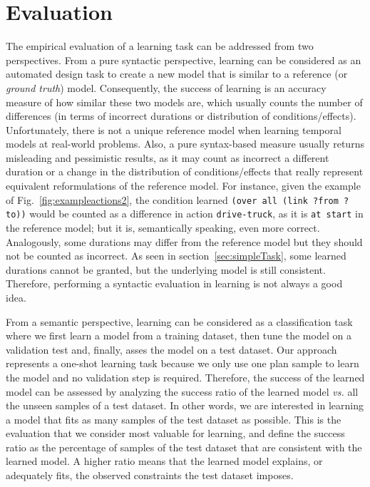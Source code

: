 \documentclass{ecai}
\begin{document}
\section{Evaluation}
\label{sec:evaluation}
The empirical evaluation of a learning task can be addressed from two perspectives. From a pure syntactic perspective, learning can be considered as an automated design task to create a new model that is similar to a reference (or {\em ground truth}) model. Consequently, the success of learning is an accuracy measure of how similar these two models are, which usually counts the number of differences (in terms of incorrect durations or distribution of conditions/effects). Unfortunately, there is not a unique reference model when learning temporal models at real-world problems. Also, a pure syntax-based measure usually returns misleading and pessimistic results, as it may count as incorrect a different duration or a change in the distribution of conditions/effects that really represent equivalent reformulations of the reference model. For instance, given the example of Fig.~\ref{fig:exampleactions2}, the condition learned \texttt{(over all (link ?from ?to))} would be counted as a difference in action \texttt{drive-truck}, as it is \texttt{at start} in the reference model; but it is, semantically speaking, even more correct. Analogously, some durations may differ from the reference model but they should not be counted as incorrect. As seen in section~\ref{sec:simpleTask}, some learned durations cannot be granted, but the underlying model is still consistent. Therefore, performing a syntactic evaluation in learning is not always a good idea.

From a semantic perspective, learning can be considered as a classification task where we first learn a model from a training dataset, then tune the model on a validation test and, finally, asses the model on a test dataset. Our approach represents a one-shot learning task because we only use one plan sample to learn the model and no validation step is required.
Therefore, the success of the learned model can be assessed by analyzing the success ratio of the learned model \emph{vs.} all the unseen samples of a test dataset. In other words, we are interested in learning a model that fits as many samples of the test dataset as possible. This is the evaluation that we consider most valuable for learning, and define the success ratio as the percentage of samples of the test dataset that are consistent with the learned model. A higher ratio means that the learned model explains, or adequately fits, the observed constraints the test dataset imposes.
\end{document}
